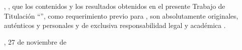 
\UTIAutoresPronombre, \UTIAutoresTexto, \UTIVerboDeclaro{} que los contenidos y los resultados obtenidos en el presente Trabajo de Titulación ``\UTITituloProyecto'', como requerimiento previo para \UTIFraseObtencionTituloProfesional{}, son absolutamente originales, auténticos y personales y de exclusiva responsabilidad legal y académica \UTIAutoresResponsabilidad.

\vspace{1.5cm}

{\raggedleft
\UTICiudadPais, 27 de noviembre de \UTIAnio\par}

\vspace{2.5cm}

\UTIFirmasAutoresBloque
